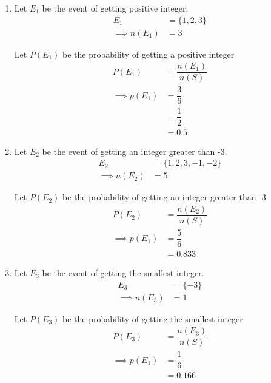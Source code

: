 \documentclass[journal,12pt,twocolumn]{IEEEtran}
\begin{document}
\begin{enumerate}[label=(\roman*)]
    \item

Let $E_1$ be the event of getting positive integer.\\
\begin{align}
E_1 &= \{1,2,3\}\\
\implies  n (E_1) &= 3
\end{align}

Let $P(E_1)$ be the probability of getting a positive integer\\
\begin{align}
    P(E_1) &=\dfrac{n(E_1)}{n(S)}\\
   \implies p(E_1)&=\dfrac{3}{6}\\
             &=\dfrac{1}{2}\\
             &=0.5
 \end{align}
 
\item
Let $E_2$ be the event of getting an integer greater than -3.\\
\begin{align}
E_2 &= \{1,2,3,-1,-2\}\\
\implies  n (E_2) &= 5
\end{align}

Let $P(E_2)$ be the probability of getting an integer greater than -3\\
\begin{align}
    P(E_2)&=\dfrac{n(E_2)}{n(S)}\\
   \implies p(E_1)&=\dfrac{5}{6}\\
                  &=0.833
 \end{align} 
 
\item
Let $E_3$ be the event of getting the smallest integer.\\
\begin{align}
E_3&=\{-3\}\\
\implies n(E_3)&=1
\end{align}

Let $P(E_3)$ be the probability of getting the smallest integer
\begin{align}
        P(E_3) &=\dfrac{n(E_3)}{n(S)}\\
        \implies p(E_1)&=\dfrac{1}{6}\\
                       &=0.166
\end{align}
\end{enumerate}
\end{document}
